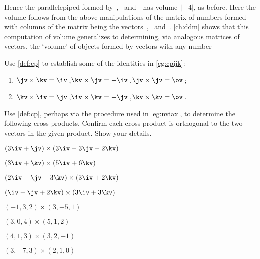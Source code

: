Hence the parallelepiped formed by~\uv, \vv\ and~\wv\ has volume~\(|-4|\), as before.
Here the volume follows from the above manipulations of the matrix of numbers formed with columns of the matrix being the vectors~\uv, \vv\ and~\wv.
\cref{ch:ddm} shows that this computation of volume generalizes to determining, via analogous matrices of vectors, the `volume' of objects formed by vectors with any number 








\sectionExercises


\begin{exercise} \label{ex:cpijk} 
Use \cref{def:cp} to establish some of the  identities in \cref{eg:cpijk}: 
%
\begin{enumerate}
\item \(\jv\times\kv=\iv\)\,,\quad \(\kv\times\jv=-\iv\)\,,\quad \(\jv\times\jv=\ov\)\,;
\item \(\kv\times\iv=\jv\)\,,\quad \(\iv\times\kv=-\jv\)\,,\quad \(\kv\times\kv=\ov\)\,.
\end{enumerate}
\end{exercise}





\begin{exercise}  
Use \cref{def:cp}, perhaps via the procedure used in \cref{eg:nviax}, to determine the following cross products. 
Confirm each cross product is orthogonal to the two vectors in the given product.
Show your details.
\begin{Parts}
\item \((3\iv+\jv)\times(3\iv -3\jv -2\kv)\)
\answer{\(-2\iv +6\jv -12\kv\)}
\item \((3\iv  +\kv)\times(5\iv +6 \kv)\)
\answer{\(-13\jv\)}
\begin{reduce}
\item \((2\iv-\jv -3\kv)\times(3\iv +2\kv)\)
\answer{\(-2\iv -13\jv +3\kv\)}
\item \((\iv -\jv +2\kv)\times(3\iv  +3\kv)\)
\answer{\(-3\iv +3\jv +3\kv\)}
\item \((-1,3,2)\times(3,-5,1)\)
\item \((3,0,4)\times(5,1,2)\)
\end{reduce}
\item \((4,1,3)\times(3,2,-1)\)
\item \((3,-7,3)\times(2,1,0)\)
\end{Parts}
\end{exercise}





